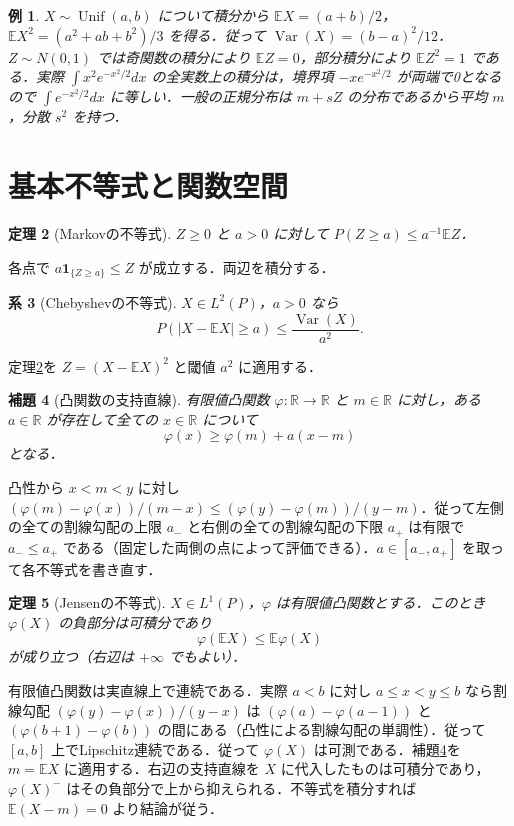 \documentclass[a5paper,10pt,onecolumn]{jsarticle}
\makeatletter
\theoremstyle{mathnotetheorem}
\newtheorem{theorem}{定理}[section]
\newtheorem{lemma}[theorem]{補題}
\newtheorem{corollary}[theorem]{系}
\newtheorem{example}[theorem]{例}
\renewcommand{\proofname}{証明}
\renewenvironment{proof}[1][\proofname]{%
  \par\pushQED{\qed}\normalfont\topsep4\p@\@plus2\p@\relax
  \trivlist\item[\hskip\labelsep\bfseries #1]\ignorespaces
}{\popQED\endtrivlist\@endpefalse}
\newcommand{\R}{\mathbb{R}}
\newcommand{\E}{\mathbb E}
\newcommand{\1}{\mathbf{1}}
\DeclareMathOperator{\Var}{Var}
\makeatother
\begin{document}
\begin{example}
$X\sim\operatorname{Unif}(a,b)$ について積分から $\E X=(a+b)/2$，$\E X^2=(a^2+ab+b^2)/3$ を得る．従って $\Var(X)=(b-a)^2/12$．$Z\sim N(0,1)$ では奇関数の積分により $\E Z=0$，部分積分により $\E Z^2=1$ である．実際 $\int x^2 e^{-x^2/2}dx$ の全実数上の積分は，境界項 $-xe^{-x^2/2}$ が両端で0となるので $\int e^{-x^2/2}dx$ に等しい．一般の正規分布は $m+sZ$ の分布であるから平均 $m$，分散 $s^2$ を持つ．
\end{example}

\section{基本不等式と関数空間}\label{sec:lp}
\begin{theorem}[Markovの不等式]\label{markov}
$Z\ge0$ と $a>0$ に対して $P(Z\ge a)\le a^{-1}\E Z$．
\end{theorem}
\begin{proof}
各点で $a\1_{\{Z\ge a\}}\le Z$ が成立する．両辺を積分する．
\end{proof}
\begin{corollary}[Chebyshevの不等式]
$X\in L^2(P)$，$a>0$ なら
\[
 P(|X-\E X|\ge a)\le\frac{\Var(X)}{a^2}.
\]
\end{corollary}
\begin{proof}
定理\ref{markov}を $Z=(X-\E X)^2$ と閾値 $a^2$ に適用する．
\end{proof}
\begin{lemma}[凸関数の支持直線]\label{support}
有限値凸関数 $\varphi:\R\to\R$ と $m\in\R$ に対し，ある $a\in\R$ が存在して全ての $x\in\R$ について
\[
 \varphi(x)\ge\varphi(m)+a(x-m)
\]
となる．
\end{lemma}
\begin{proof}
凸性から $x<m<y$ に対し $(\varphi(m)-\varphi(x))/(m-x)\le(\varphi(y)-\varphi(m))/(y-m)$．従って左側の全ての割線勾配の上限 $a_-$ と右側の全ての割線勾配の下限 $a_+$ は有限で $a_-\le a_+$ である（固定した両側の点によって評価できる）．$a\in[a_-,a_+]$ を取って各不等式を書き直す．
\end{proof}
\begin{theorem}[Jensenの不等式]
$X\in L^1(P)$，$\varphi$ は有限値凸関数とする．このとき $\varphi(X)$ の負部分は可積分であり
\[
 \varphi(\E X)\le\E\varphi(X)
\]
が成り立つ（右辺は $+\infty$ でもよい）．
\end{theorem}
\begin{proof}
有限値凸関数は実直線上で連続である．実際 $a<b$ に対し $a\le x<y\le b$ なら割線勾配 $(\varphi(y)-\varphi(x))/(y-x)$ は $(\varphi(a)-\varphi(a-1))$ と $(\varphi(b+1)-\varphi(b))$ の間にある（凸性による割線勾配の単調性）．従って $[a,b]$ 上でLipschitz連続である．従って $\varphi(X)$ は可測である．補題\ref{support}を $m=\E X$ に適用する．右辺の支持直線を $X$ に代入したものは可積分であり，$\varphi(X)^-$ はその負部分で上から抑えられる．不等式を積分すれば $\E(X-m)=0$ より結論が従う．
\end{proof}
\end{document}
